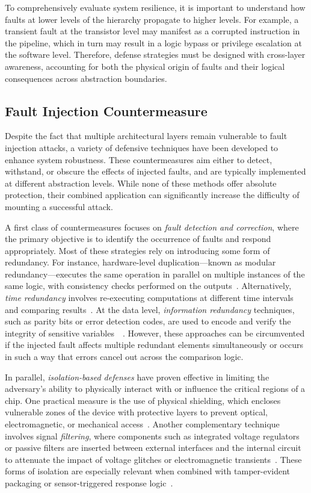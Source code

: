 To comprehensively evaluate system resilience, it is important to understand how faults at lower levels of the hierarchy propagate to higher levels. For example, a transient fault at the transistor level may manifest as a corrupted instruction in the pipeline, which in turn may result in a logic bypass or privilege escalation at the software level. Therefore, defense strategies must be designed with cross-layer awareness, accounting for both the physical origin of faults and their logical consequences across abstraction boundaries.

\subsection{Fault Injection Countermeasure}
Despite the fact that multiple architectural layers remain vulnerable to fault injection attacks, a variety of defensive techniques have been developed to enhance system robustness. These countermeasures aim either to detect, withstand, or obscure the effects of injected faults, and are typically implemented at different abstraction levels. While none of these methods offer absolute protection, their combined application can significantly increase the difficulty of mounting a successful attack.

A first class of countermeasures focuses on \textit{fault detection and correction}, where the primary objective is to identify the occurrence of faults and respond appropriately. Most of these strategies rely on introducing some form of redundancy. For instance, hardware-level duplication—known as modular redundancy—executes the same operation in parallel on multiple instances of the same logic, with consistency checks performed on the outputs~\cite{dutertre2011review}. Alternatively, \textit{time redundancy} involves re-executing computations at different time intervals and comparing results~\cite{manssour2022processor}. At the data level, \textit{information redundancy} techniques, such as parity bits or error detection codes, are used to encode and verify the integrity of sensitive variables~\cite{yuce2016fame}~\cite{elbaz2009hardware}. However, these approaches can be circumvented if the injected fault affects multiple redundant elements simultaneously or occurs in such a way that errors cancel out across the comparison logic.

In parallel, \textit{isolation-based defenses} have proven effective in limiting the adversary's ability to physically interact with or influence the critical regions of a chip. One practical measure is the use of physical shielding, which encloses vulnerable zones of the device with protective layers to prevent optical, electromagnetic, or mechanical access~\cite{avital2024enhancing}. Another complementary technique involves signal \textit{filtering}, where components such as integrated voltage regulators or passive filters are inserted between external interfaces and the internal circuit to attenuate the impact of voltage glitches or electromagnetic transients~\cite{fanjas2022combined}. These forms of isolation are especially relevant when combined with tamper-evident packaging or sensor-triggered response logic~\cite{qi2016design}.


